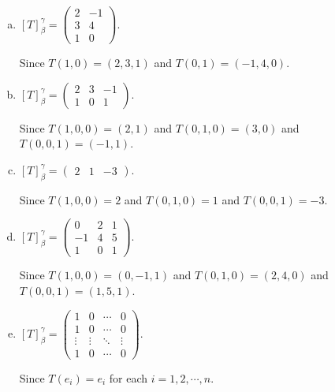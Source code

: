 \begin{Exercise}
\begin{enumerate}[(a)]
\item
\begin{answer}
$[T]_{\beta}^{\gamma} = \begin{pmatrix}
2 & -1 \\
3 & 4 \\
1 & 0
\end{pmatrix}$.
\end{answer}
\begin{solution}
Since $T(1,0) = (2,3,1)$ and $T(0,1) = (-1,4,0)$.
\end{solution}

\item
\begin{answer}
$[T]_{\beta}^{\gamma} = \begin{pmatrix}
2 & 3 & -1 \\
1 & 0 & 1
\end{pmatrix}$.
\end{answer}
\begin{solution}
Since $T(1,0,0) = (2,1)$ and $T(0,1,0) = (3,0)$ and $T(0,0,1) = (-1,1)$.
\end{solution}

\item
\begin{answer}
$[T]_{\beta}^{\gamma} = \begin{pmatrix}
2 & 1 & -3
\end{pmatrix}$.
\end{answer}
\begin{solution}
Since $T(1,0,0) = 2$ and $T(0,1,0) = 1$ and $T(0,0,1) = -3$.
\end{solution}

\item
\begin{answer}
$[T]_{\beta}^{\gamma} = \begin{pmatrix}
0 & 2 & 1 \\
-1 & 4 & 5 \\
1 & 0 & 1
\end{pmatrix}$.
\end{answer}
\begin{solution}
Since $T(1,0,0) = (0,-1,1)$ and $T(0,1,0) = (2,4,0)$ and $T(0,0,1) = (1,5,1)$.
\end{solution}

\item
\begin{answer}
$[T]_{\beta}^{\gamma} = \begin{pmatrix}
1 & 0 & \cdots & 0 \\
1 & 0 & \cdots & 0 \\
\vdots & \vdots & \ddots & \vdots \\
1 & 0 & \cdots & 0
\end{pmatrix}$.
\end{answer}
\begin{solution}
Since $T(e_i) = e_i$ for each $i=1,2,\cdots, n$.
\end{solution}


\end{enumerate}
\end{Exercise}
